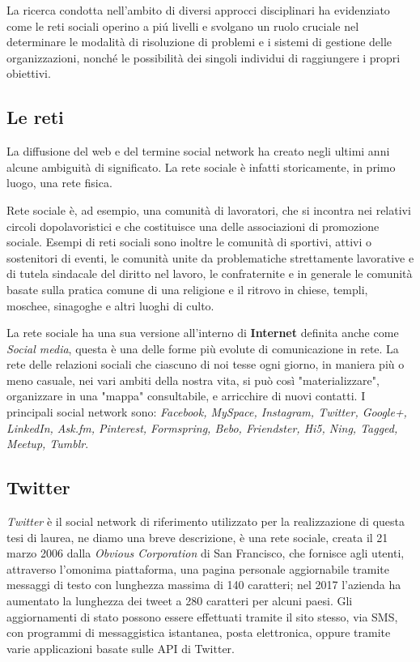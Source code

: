 La ricerca condotta nell'ambito di diversi approcci disciplinari ha evidenziato come le reti sociali operino a pi\'u livelli e svolgano un ruolo cruciale nel determinare le modalità di risoluzione di problemi e i sistemi di gestione delle organizzazioni, nonché le possibilità dei singoli individui di raggiungere i propri obiettivi.

\subsection{Le reti}
La diffusione del web e del termine social network ha creato negli ultimi anni alcune ambiguità di significato. La rete sociale è infatti storicamente, in primo luogo, una rete fisica.

Rete sociale è, ad esempio, una comunità di lavoratori, che si incontra nei relativi circoli dopolavoristici e che costituisce una delle associazioni di promozione sociale. Esempi di reti sociali sono inoltre le comunità di sportivi, attivi o sostenitori di eventi, le comunità unite da problematiche strettamente lavorative e di tutela sindacale del diritto nel lavoro, le confraternite e in generale le comunità basate sulla pratica comune di una religione e il ritrovo in chiese, templi, moschee, sinagoghe e altri luoghi di culto.

La rete sociale ha una sua versione all'interno di \textbf{Internet} definita anche come \textit{Social media}, questa è una delle forme più evolute di comunicazione in rete. La rete delle relazioni sociali che ciascuno di noi tesse ogni giorno, in maniera più o meno casuale, nei vari ambiti della nostra vita, si può così "materializzare", organizzare in una "mappa" consultabile, e arricchire di nuovi contatti. I principali social network sono: \textit{Facebook, MySpace, Instagram, Twitter, Google+, LinkedIn, Ask.fm, Pinterest, Formspring, Bebo, Friendster, Hi5, Ning, Tagged, Meetup, Tumblr}.

\subsection{Twitter}
\textit{Twitter} è il social network di riferimento utilizzato per la realizzazione di questa tesi di laurea, ne diamo una breve descrizione, è una rete sociale, creata il 21 marzo 2006 dalla \textit{Obvious Corporation} di San Francisco, che fornisce agli utenti, attraverso l'omonima piattaforma, una pagina personale aggiornabile tramite messaggi di testo con lunghezza massima di 140 caratteri; nel 2017 l'azienda ha aumentato la lunghezza dei tweet a 280 caratteri per alcuni paesi. Gli aggiornamenti di stato possono essere effettuati tramite il sito stesso, via SMS, con programmi di messaggistica istantanea, posta elettronica, oppure tramite varie applicazioni basate sulle API di Twitter. 

